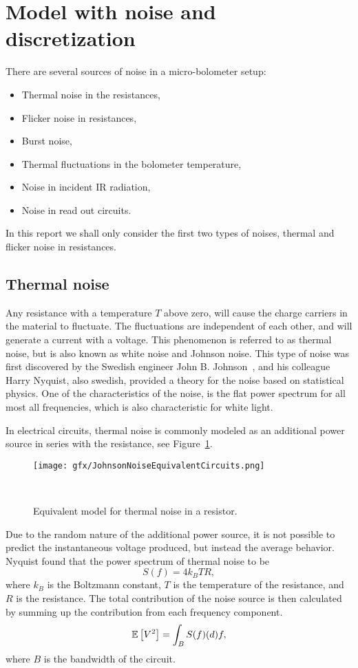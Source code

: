 \section{Model with noise and discretization}

There are several sources of noise in a micro-bolometer setup:
\begin{itemize}
\item Thermal noise in the resistances,
\item Flicker noise in resistances,
\item Burst noise,
\item Thermal fluctuations in the bolometer temperature,
\item Noise in incident IR radiation,
\item Noise in read out circuits.
\end{itemize}

In this report we shall only consider the first two types of noises,
thermal and flicker noise in resistances.

\subsection{Thermal noise}

Any resistance with a temperature $T$ above zero, will cause the
charge carriers in the material to fluctuate. The fluctuations are
independent of each other, and will generate a current with a
voltage. This phenomenon is referred to as thermal noise, but is also
known as white noise and Johnson noise. This type of noise was first
discovered by the Swedish engineer John
B. Johnson~\cite{PhysRev.32.97}, and his colleague Harry Nyquist, also
swedish, provided a theory for the noise based on statistical
physics\cite{PhysRev.32.110}. One of the characteristics of the noise,
is the flat power spectrum for all most all frequencies, which is also
characteristic for white light.

In electrical circuits, thermal noise is commonly modeled as an additional
power source in series with the resistance, see Figure~\ref{fig:johnsonEquivalentNoise}.
\begin{figure}
  \centering
  \texttt{[image: gfx/JohnsonNoiseEquivalentCircuits.png]}
  \caption{Equivalent model for thermal noise in a resistor.}~\label{fig:johnsonEquivalentNoise}
\end{figure}
Due to the random nature of the additional power source, it is not
possible to predict the instantaneous voltage produced, but instead the
average behavior. Nyquist\cite{PhysRev.32.110} found that the power
spectrum of thermal noise to be
\begin{equation}
  \label{eq:power_spectrum_white_noise}
  S(f) = 4 k_B T R,
\end{equation}
where $k_B$ is the Boltzmann constant, $T$ is the temperature of the
resistance, and $R$ is the resistance. The total contribution of the
noise source is then calculated by summing up the contribution from
each frequency component.
\begin{equation}
  \label{eq:2}
  {\mathbb E} \left[ V^2 \right] = \int_B S(f) \mathrm(d) f,
\end{equation}
where $B$ is the bandwidth of the circuit.

